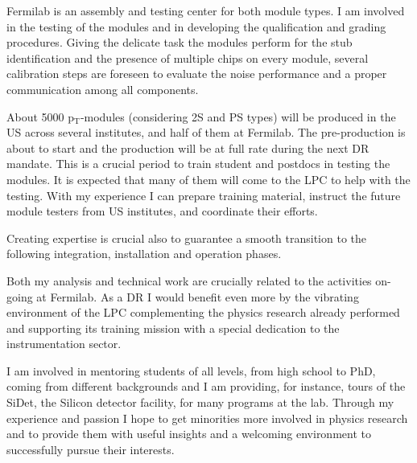 {\begin{flushleft}
Fermilab is an assembly and testing center for both module types. I am involved in the testing of the modules and in developing the qualification and grading procedures. Giving the delicate task the modules perform for the stub identification and the presence of multiple chips on every module, several calibration steps are foreseen to evaluate the noise performance and a proper communication among all components. 

About 5000 p$_{\mathrm{T}}$-modules (considering 2S and PS types) will be produced in the US across several institutes, and half of them at Fermilab. The pre-production is about to start and the production will be at full rate during the next DR mandate. This is a crucial period to train student and postdocs in testing the modules. It is expected that many of them will come to the LPC to help with the testing. With my experience I can prepare training material, instruct the future module testers from US institutes, and coordinate their efforts.

Creating expertise is crucial also to guarantee a smooth transition to the following integration, installation and operation phases. 



 \vspace{\baselineskip}
 
Both my analysis and technical work are crucially related to the activities on-going at Fermilab. As a DR I would benefit even more by the vibrating environment of the LPC  complementing the physics research already performed and supporting its training mission with a special dedication to the instrumentation sector.

I am involved in mentoring students of all levels, from high school to PhD, coming from different backgrounds and I am providing, for instance, tours of the SiDet,  the Silicon detector facility, for many programs at the lab. Through my experience and passion I hope to get minorities more involved in physics research and to provide them with useful insights and a welcoming environment to successfully pursue their interests.


\end{flushleft}
}
